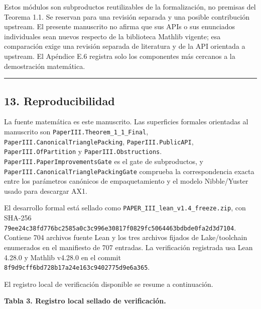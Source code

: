 \documentclass[spanish,11pt,a4paper]{article}
\begin{document}
Estos módulos son subproductos reutilizables de la formalización, no
premisas del Teorema 1.1. Se reservan para una revisión separada y una
posible contribución upstream. El presente manuscrito no afirma que sus
APIs o sus enunciados individuales sean nuevos respecto de la biblioteca
Mathlib vigente; esa comparación exige una revisión separada de
literatura y de la API orientada a upstream. El Apéndice E.6 registra
solo los componentes más cercanos a la demostración matemática.

\begin{center}\rule{0.5\linewidth}{0.5pt}\end{center}

\subsection{13. Reproducibilidad}\label{reproducibilidad}

La fuente matemática es este manuscrito. Las superficies formales
orientadas al manuscrito son \nolinkurl{PaperIII.Theorem_1_1_Final},
\nolinkurl{PaperIII.CanonicalTrianglePacking}, \nolinkurl{PaperIII.PublicAPI},
\nolinkurl{PaperIII.OfPartition} y \nolinkurl{PaperIII.Obstructions}.
\nolinkurl{PaperIII.PaperImprovementsGate} es el gate de subproductos, y
\nolinkurl{PaperIII.CanonicalTrianglePackingGate} comprueba la
correspondencia exacta entre los parámetros canónicos de empaquetamiento
y el modelo Nibble/Yuster usado para descargar AX1.

El desarrollo formal está sellado como
\nolinkurl{PAPER_III_lean_v1.4_freeze.zip}, con SHA-256
\nolinkurl{79ee24c38fd776bc2585a0c3c996e30817f0829fc5064463bdbde0fa2d3d7104}.
Contiene 704 archivos fuente Lean y los tres archivos fijados de
Lake/toolchain enumerados en el manifiesto de 707 entradas. La
verificación registrada usa Lean 4.28.0 y Mathlib v4.28.0 en el commit
\nolinkurl{8f9d9cff6bd728b17a24e163c9402775d9e6a365}.

El registro local de verificación disponible se resume a continuación.

\textbf{Tabla 3. Registro local sellado de verificación.}
\end{document}
